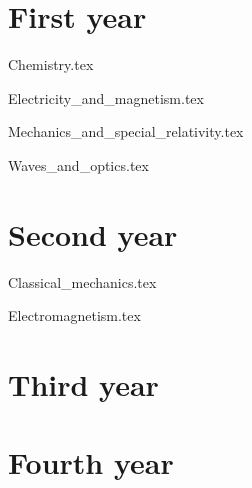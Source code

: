 \documentclass{report}
\begin{document}
    \chapter{First year}
        {Chemistry.tex}
        \cleardoublepage
        
        {Electricity_and_magnetism.tex}
        \cleardoublepage
        
        {Mechanics_and_special_relativity.tex}
        \cleardoublepage
        
        {Waves_and_optics.tex}
        \cleardoublepage
    \chapter{Second year}
        {Classical_mechanics.tex}
        \cleardoublepage
        
        {Electromagnetism.tex}
        \cleardoublepage
    \chapter{Third year}
    \chapter{Fourth year}
\end{document}
